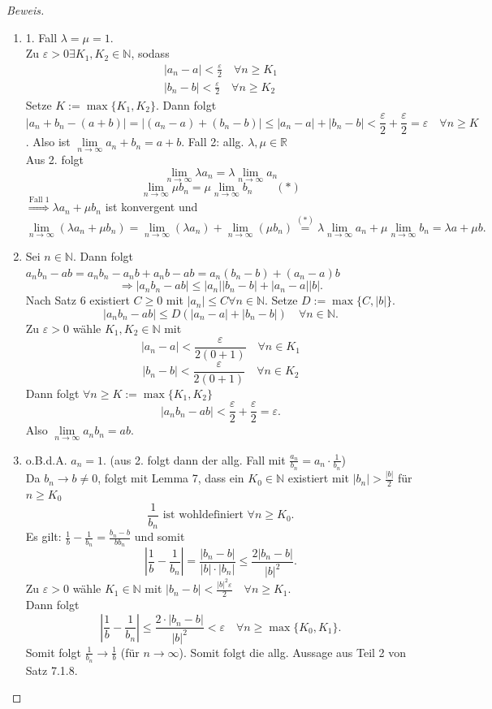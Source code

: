 \documentclass[12pt,a4paper,titlepage]{article} %
\theoremstyle{definition}
\theoremstyle{remark}
\newenvironment{bew}{\begin{proof}[Beweis]}{\end{proof}}
\newcommand{\N}{\mathbb{N}}
\newcommand{\R}{\mathbb{R}}
\newcommand{\limes}[1]{\lim\limits_{#1\rightarrow\infty}}
\begin{document}
\begin{bew}
	\begin{enumerate}
		\item 1. Fall $\lambda = \mu = 1$.\\
		Zu $\varepsilon>0 \exists K_1, K_2 \in\N$, sodass
		\begin{align*}
			|a_n-a|<\frac{\varepsilon}{2} \quad \forall n\geq K_1\\
			|b_n-b|<\frac{\varepsilon}{2} \quad \forall n\geq K_2
		\end{align*}
		Setze $K := \max \{K_1, K_2\}$. Dann folgt 
		$$|a_n + b_n - (a+b)| = |(a_n-a)+(b_n-b)| \leq |a_n-a|+|b_n-b| < \frac{\varepsilon}{2} + \frac{\varepsilon}{2} = \varepsilon \quad \forall n\geq K$$.
		Also ist $\limes{n}a_n+b_n=a+b$.
		Fall 2: allg. $\lambda,\mu\in\R$\\
		Aus 2. folgt 
		$$\limes{n} \lambda a_n = \lambda \limes{n} a_n$$
		$$\limes{n} \mu b_n = \mu \limes{n} b_n \qquad(*)$$
		$\overset{\text{Fall 1}}{\Rightarrow} \lambda a_n + \mu b_n$ ist konvergent und $$\limes{n} (\lambda a_n + \mu b_n) = \limes{n} (\lambda a_n) + \limes{n} (\mu b_n) \overset{(*)}{=} \lambda \limes{n} a_n + \mu \limes{n} b_n = \lambda a + \mu b.$$
		\item Sei $n\in\N$. Dann folgt $a_nb_n-ab = a_nb_n -a_nb + a_n b - ab=a_n(b_n-b)+(a_n-a)b$
		$$\Rightarrow |a_nb_n -ab|\leq |a_n| |b_n-b| + |a_n-a||b|.$$
		Nach Satz 6 existiert $C\geq 0$ mit $|a_n|\leq C \forall n\in\N$. Setze $D:= \max \{C, |b|\}$. 
		$$|a_nb_n-ab| \leq D(|a_n-a|+|b_n-b|) \quad \forall n\in\N.$$
		Zu $\varepsilon > 0$ wähle $K_1,K_2\in\N$ mit $$|a_n-a|<\frac{\varepsilon}{2(0+1)} \quad \forall n\in K_1$$
		$$|b_n-b|<\frac{\varepsilon}{2(0+1)} \quad \forall n\in K_2$$
		Dann folgt $\forall n\geq K := \max \{K_1, K_2\}$
		$$|a_nb_n -ab|<\frac{\varepsilon}{2} + \frac{\varepsilon}{2} = \varepsilon.$$
		Also $\limes{n} a_nb_n = ab$.
		\item o.B.d.A. \(a_n = 1\). (aus 2. folgt dann der allg. Fall mit \( \frac{a_n}{b_n} = a_n \cdot\frac{1}{b_n} \))\\
		Da \(b_n \rightarrow b \neq 0\), folgt mit Lemma 7, dass ein \(K_0\in\N\) existiert mit \(|b_n| >\frac{|b|}{2} \) für \(n\geq K_0\) 
		\[\frac{1}{b_n} \text{ ist wohldefiniert } \forall n\geq K_0.\]
		Es gilt: \( \frac{1}{b} - \frac{1}{b_n} = \frac{b_n - b}{b b_n} \) und somit 
		\[ \left| \frac{1}{b} - \frac{1}{b_n} \right| = \frac{|b_n-b|}{|b| \cdot |b_n|} \leq \frac{2 |b_n - b|}{|b|^2}. \]
		Zu \(\varepsilon >0 \) wähle \(K_1 \in \N \) mit \(|b_n - b| < \frac{|b|^2\varepsilon}{2} \quad \forall n\geq K_1 \).\\
		Dann folgt 
		\[ \left| \frac{1}{b} - \frac{1}{b_n} \right| \leq \frac{2 \cdot |b_n - b|}{|b|^2} < \varepsilon \quad \forall n\geq\max \{ K_0,K_1\}. \]
		Somit folgt \( \frac{1}{b_n} \rightarrow \frac{1}{b} \) (für \(n\rightarrow \infty \)). Somit folgt die allg. Aussage aus Teil 2 von Satz 7.1.8.
	\end{enumerate}
\end{bew}
\end{document}
